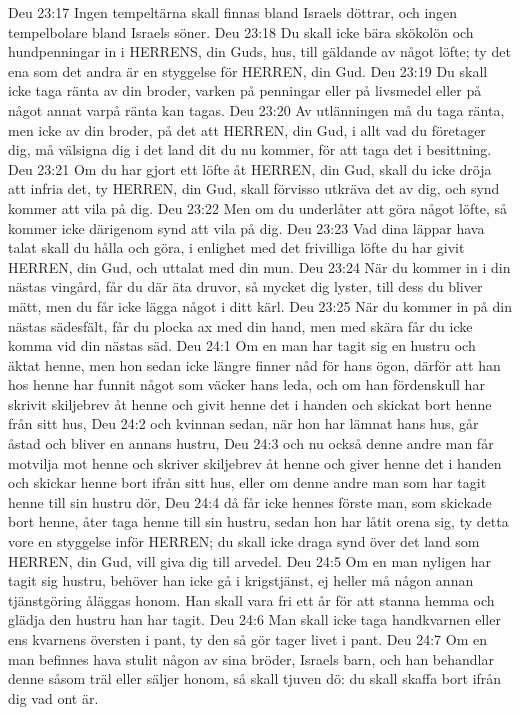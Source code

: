 Deu 23:17  Ingen tempeltärna skall finnas bland Israels döttrar, och ingen tempelbolare bland Israels söner.
Deu 23:18  Du skall icke bära skökolön och hundpenningar in i HERRENS, din Guds, hus, till gäldande av något löfte; ty det ena som det andra är en styggelse för HERREN, din Gud.
Deu 23:19  Du skall icke taga ränta av din broder, varken på penningar eller på livsmedel eller på något annat varpå ränta kan tagas.
Deu 23:20  Av utlänningen må du taga ränta, men icke av din broder, på det att HERREN, din Gud, i allt vad du företager dig, må välsigna dig i det land dit du nu kommer, för att taga det i besittning.
Deu 23:21  Om du har gjort ett löfte åt HERREN, din Gud, skall du icke dröja att infria det, ty HERREN, din Gud, skall förvisso utkräva det av dig, och synd kommer att vila på dig.
Deu 23:22  Men om du underlåter att göra något löfte, så kommer icke därigenom synd att vila på dig.
Deu 23:23  Vad dina läppar hava talat skall du hålla och göra, i enlighet med det frivilliga löfte du har givit HERREN, din Gud, och uttalat med din mun.
Deu 23:24  När du kommer in i din nästas vingård, får du där äta druvor, så mycket dig lyster, till dess du bliver mätt, men du får icke lägga något i ditt kärl.
Deu 23:25  När du kommer in på din nästas sädesfält, får du plocka ax med din hand, men med skära får du icke komma vid din nästas säd.
Deu 24:1  Om en man har tagit sig en hustru och äktat henne, men hon sedan icke längre finner nåd för hans ögon, därför att han hos henne har funnit något som väcker hans leda, och om han fördenskull har skrivit skiljebrev åt henne och givit henne det i handen och skickat bort henne från sitt hus,
Deu 24:2  och kvinnan sedan, när hon har lämnat hans hus, går åstad och bliver en annans hustru,
Deu 24:3  och nu också denne andre man får motvilja mot henne och skriver skiljebrev åt henne och giver henne det i handen och skickar henne bort ifrån sitt hus, eller om denne andre man som har tagit henne till sin hustru dör,
Deu 24:4  då får icke hennes förste man, som skickade bort henne, åter taga henne till sin hustru, sedan hon har låtit orena sig, ty detta vore en styggelse inför HERREN; du skall icke draga synd över det land som HERREN, din Gud, vill giva dig till arvedel.
Deu 24:5  Om en man nyligen har tagit sig hustru, behöver han icke gå i krigstjänst, ej heller må någon annan tjänstgöring åläggas honom. Han skall vara fri ett år för att stanna hemma och glädja den hustru han har tagit.
Deu 24:6  Man skall icke taga handkvarnen eller ens kvarnens översten i pant, ty den så gör tager livet i pant.
Deu 24:7  Om en man befinnes hava stulit någon av sina bröder, Israels barn, och han behandlar denne såsom träl eller säljer honom, så skall tjuven dö: du skall skaffa bort ifrån dig vad ont är.
